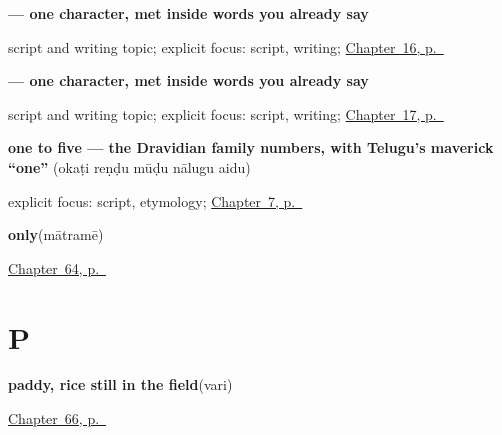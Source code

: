 \noindent\begin{minipage}[t]{\linewidth}
\raggedright
\textbf{ — one character, met inside words you already say}\par
\footnotesize script and writing topic; explicit focus: script, writing; \hyperref[ch:te-traditional-months]{Chapter~16, p.~\pageref*{ch:te-traditional-months}}
\end{minipage}\par\smallskip

\noindent\begin{minipage}[t]{\linewidth}
\raggedright
\textbf{ — one character, met inside words you already say}\par
\footnotesize script and writing topic; explicit focus: script, writing; \hyperref[ch:te-noon-and-midnight]{Chapter~17, p.~\pageref*{ch:te-noon-and-midnight}}
\end{minipage}\par\smallskip

\noindent\begin{minipage}[t]{\linewidth}
\raggedright
\textbf{one to five — the Dravidian family numbers, with Telugu's maverick \textquotedblleft{}one\textquotedblright{}}\enspace\emph{    }\enspace(okaṭi reṇḍu mūḍu nālugu aidu)\par
\footnotesize explicit focus: script, etymology; \hyperref[ch:te-numbers-one-to-ten]{Chapter~7, p.~\pageref*{ch:te-numbers-one-to-ten}}
\end{minipage}\par\smallskip

\noindent\begin{minipage}[t]{\linewidth}
\raggedright
\textbf{only}\enspace\emph{}\enspace(mātramē)\par
\footnotesize \hyperref[ch:te-joining-words]{Chapter~64, p.~\pageref*{ch:te-joining-words}}
\end{minipage}\par\smallskip

\section*{P}

\noindent\begin{minipage}[t]{\linewidth}
\raggedright
\textbf{paddy, rice still in the field}\enspace\emph{}\enspace(vari)\par
\footnotesize \hyperref[ch:te-the-field]{Chapter~66, p.~\pageref*{ch:te-the-field}}
\end{minipage}\par\smallskip

